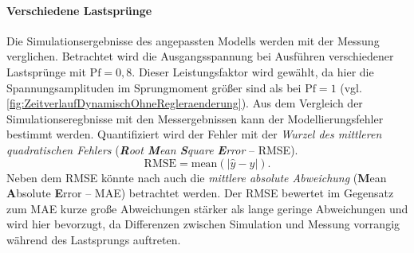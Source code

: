 \paragraph{Verschiedene Lastsprünge}
Die Simulationsergebnisse des angepassten Modells werden mit der Messung verglichen. Betrachtet wird die Ausgangsspannung bei Ausführen verschiedener Lastsprünge mit $\mathrm{Pf}=0,8$. Dieser Leistungsfaktor wird gewählt, da hier die Spannungsamplituden im Sprungmoment größer sind als bei $\mathrm{Pf}=1$ (vgl. \cref{fig:ZeitverlaufDynamischOhneRegleraenderung}). Aus dem Vergleich der Simulationseregbnisse mit den Messergebnissen kann der Modellierungsfehler bestimmt werden. Quantifiziert wird der Fehler mit der \emph{Wurzel des mittleren quadratischen Fehlers} (\emph{\textbf{R}oot \textbf{M}ean \textbf{S}quare \textbf{E}rror} -- RMSE). \begin{equation}
\mathrm{RMSE} = \mathrm{mean}\left(\left| \hat{y} - y \right|\right).
\end{equation}
Neben dem RMSE könnte nach \cite{pontius_components_2008} auch die \emph{mittlere absolute Abweichung} (\textbf{M}ean \textbf{A}bsolute \textbf{E}rror -- MAE) betrachtet werden. Der RMSE bewertet im Gegensatz zum MAE kurze große Abweichungen stärker als lange geringe Abweichungen und wird hier bevorzugt, da Differenzen zwischen Simulation und Messung vorrangig während des Lastsprungs auftreten.

